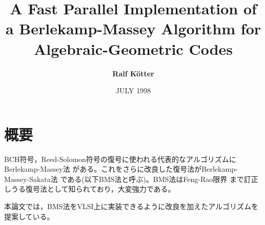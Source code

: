 \documentclass[12pt]{jarticle}
\title{\bf{A Fast Parallel Implementation of a Berlekamp-Massey Algorithm for
Algebraic-Geometric Codes}}
\date{\hfill}
\author{\bf{Ralf K\"{o}tter}}
\date{JULY 1998}
\theoremstyle{break}
\begin{document}
\maketitle

\section{概要}
BCH符号，Reed-Solomon符号の復号に使われる代表的なアルゴリズムにBerlekamp-Massey法
がある。これをさらに改良した復号法がBerlekamp-Massey-Sakata法\cite{Sakata1990207}
\cite{Sakata1991191}\cite{476248}である(以下BMS法と呼ぶ)。BMS法はFeng-Rao限界
\cite{179340}まで訂正しうる復号法として知られており，大変強力である。

本論文\cite{681314}では，BMS法をVLSI上に実装できるように改良を加えたアルゴリズムを提案している。
\end{document}
